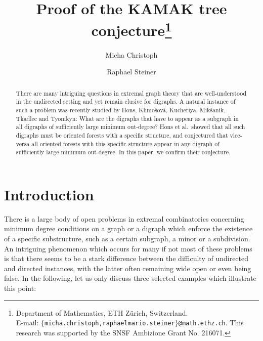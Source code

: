 \documentclass[a4paper,11pt]{article}
\title{Proof of the KAMAK tree conjecture\thanks{Department of Mathematics, ETH Z\"{u}rich, Switzerland.\\
 E-mail: {\tt $\{$micha.christoph,raphaelmario.steiner$\}$@math.ethz.ch}.
 This research was supported by the SNSF Ambizione Grant No. 216071.
}}
\author{Micha Christoph\and Raphael Steiner
}
\date{}
\theoremstyle{definition}
\begin{document}
\maketitle
\begin{abstract}
There are many intriguing questions in extremal graph theory that are well-understood in the undirected setting and yet remain elusive for digraphs. A natural instance of such a problem was recently studied by Hons, Klimo\v{s}ov\'{a}, Kucheriya, Mik\v{s}an\'{i}k, Tkadlec and Tyomkyn: What are the digraphs that have to appear as a subgraph in all digraphs of sufficiently large minimum out-degree? Hons et al.~showed that all such digraphs must be oriented forests with a specific structure, and conjectured that vice-versa all oriented forests with this specific structure appear in any digraph of sufficiently large minimum out-degree. 
In this paper, we confirm their conjecture.
\end{abstract}
\section{Introduction}
There is a large body of open problems in extremal combinatorics concerning minimum degree conditions on a graph or a digraph which enforce the existence of a specific substructure, such as a certain subgraph, a minor or a subdivision. An intriguing phenomenon which occurs for many if not most of these problems is that there seems to be a stark difference between the difficulty of undirected and directed instances, with the latter often remaining wide open or even being false. In the following, let us only discuss three selected examples which illustrate this point:
\end{document}
